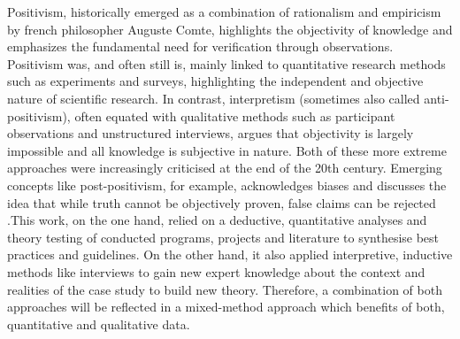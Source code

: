 Positivism, historically emerged as a combination of rationalism and empiricism by french philosopher Auguste Comte, highlights the objectivity of knowledge and emphasizes the fundamental need for verification through observations. Positivism was, and often still is, mainly linked to quantitative research methods such as experiments and surveys, highlighting the independent and objective nature of scientific research. In contrast, interpretism (sometimes also called anti-positivism), often equated with qualitative methods such as participant observations and unstructured interviews, argues that objectivity is largely impossible and all knowledge is subjective in nature. Both of these more extreme approaches were increasingly criticised at the end of the 20th century. Emerging concepts like post-positivism, for example, acknowledges biases and discusses the idea that while truth cannot be objectively proven, false claims can be rejected \autocite{pelzResearchMethodsSocial,trochimResearchMethodsKnowledge2001}.\linebreak[1]
This work, on the one hand, relied on a deductive, quantitative analyses and theory testing of conducted programs, projects and literature to synthesise best practices and guidelines. On the other hand, it also applied interpretive, inductive methods like interviews to gain new expert knowledge about the context and realities of the case study to build new theory. Therefore, a combination of both approaches will be reflected in a mixed-method approach which benefits of both, quantitative and qualitative data.

